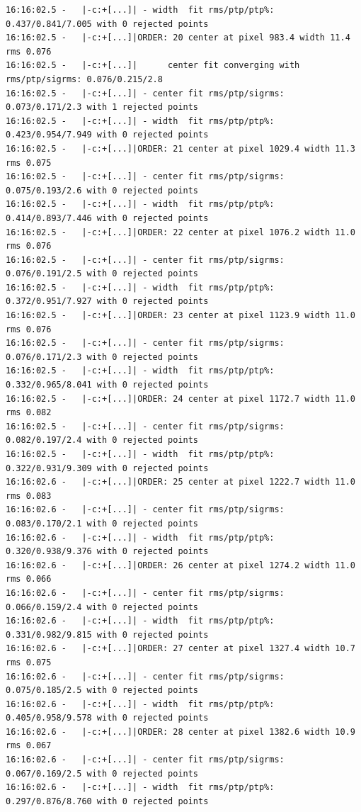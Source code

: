 \begin{lstlisting}[style=text]
16:16:02.5 -   |-c:+[...]| - width  fit rms/ptp/ptp%: 0.437/0.841/7.005 with 0 rejected points
16:16:02.5 -   |-c:+[...]|ORDER: 20 center at pixel 983.4 width 11.4 rms 0.076
16:16:02.5 -   |-c:+[...]|      center fit converging with rms/ptp/sigrms: 0.076/0.215/2.8
16:16:02.5 -   |-c:+[...]| - center fit rms/ptp/sigrms: 0.073/0.171/2.3 with 1 rejected points
16:16:02.5 -   |-c:+[...]| - width  fit rms/ptp/ptp%: 0.423/0.954/7.949 with 0 rejected points
16:16:02.5 -   |-c:+[...]|ORDER: 21 center at pixel 1029.4 width 11.3 rms 0.075
16:16:02.5 -   |-c:+[...]| - center fit rms/ptp/sigrms: 0.075/0.193/2.6 with 0 rejected points
16:16:02.5 -   |-c:+[...]| - width  fit rms/ptp/ptp%: 0.414/0.893/7.446 with 0 rejected points
16:16:02.5 -   |-c:+[...]|ORDER: 22 center at pixel 1076.2 width 11.0 rms 0.076
16:16:02.5 -   |-c:+[...]| - center fit rms/ptp/sigrms: 0.076/0.191/2.5 with 0 rejected points
16:16:02.5 -   |-c:+[...]| - width  fit rms/ptp/ptp%: 0.372/0.951/7.927 with 0 rejected points
16:16:02.5 -   |-c:+[...]|ORDER: 23 center at pixel 1123.9 width 11.0 rms 0.076
16:16:02.5 -   |-c:+[...]| - center fit rms/ptp/sigrms: 0.076/0.171/2.3 with 0 rejected points
16:16:02.5 -   |-c:+[...]| - width  fit rms/ptp/ptp%: 0.332/0.965/8.041 with 0 rejected points
16:16:02.5 -   |-c:+[...]|ORDER: 24 center at pixel 1172.7 width 11.0 rms 0.082
16:16:02.5 -   |-c:+[...]| - center fit rms/ptp/sigrms: 0.082/0.197/2.4 with 0 rejected points
16:16:02.5 -   |-c:+[...]| - width  fit rms/ptp/ptp%: 0.322/0.931/9.309 with 0 rejected points
16:16:02.6 -   |-c:+[...]|ORDER: 25 center at pixel 1222.7 width 11.0 rms 0.083
16:16:02.6 -   |-c:+[...]| - center fit rms/ptp/sigrms: 0.083/0.170/2.1 with 0 rejected points
16:16:02.6 -   |-c:+[...]| - width  fit rms/ptp/ptp%: 0.320/0.938/9.376 with 0 rejected points
16:16:02.6 -   |-c:+[...]|ORDER: 26 center at pixel 1274.2 width 11.0 rms 0.066
16:16:02.6 -   |-c:+[...]| - center fit rms/ptp/sigrms: 0.066/0.159/2.4 with 0 rejected points
16:16:02.6 -   |-c:+[...]| - width  fit rms/ptp/ptp%: 0.331/0.982/9.815 with 0 rejected points
16:16:02.6 -   |-c:+[...]|ORDER: 27 center at pixel 1327.4 width 10.7 rms 0.075
16:16:02.6 -   |-c:+[...]| - center fit rms/ptp/sigrms: 0.075/0.185/2.5 with 0 rejected points
16:16:02.6 -   |-c:+[...]| - width  fit rms/ptp/ptp%: 0.405/0.958/9.578 with 0 rejected points
16:16:02.6 -   |-c:+[...]|ORDER: 28 center at pixel 1382.6 width 10.9 rms 0.067
16:16:02.6 -   |-c:+[...]| - center fit rms/ptp/sigrms: 0.067/0.169/2.5 with 0 rejected points
16:16:02.6 -   |-c:+[...]| - width  fit rms/ptp/ptp%: 0.297/0.876/8.760 with 0 rejected points

\end{lstlisting}
